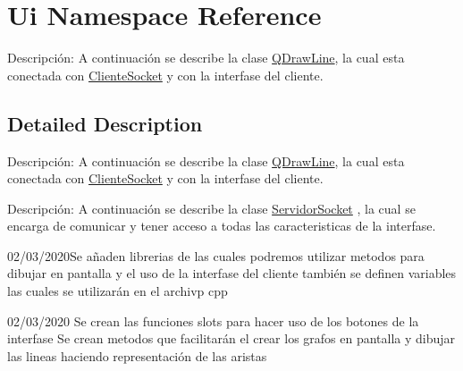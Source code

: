 \hypertarget{namespace_ui}{}\section{Ui Namespace Reference}
\label{namespace_ui}


Descripción\+: A continuación se describe la clase \hyperlink{class_q_draw_line}{Q\+Draw\+Line}, la cual esta conectada con \hyperlink{class_cliente_socket}{Cliente\+Socket} y con la interfase del cliente.  




\subsection{Detailed Description}
Descripción\+: A continuación se describe la clase \hyperlink{class_q_draw_line}{Q\+Draw\+Line}, la cual esta conectada con \hyperlink{class_cliente_socket}{Cliente\+Socket} y con la interfase del cliente. 

Descripción\+: A continuación se describe la clase \hyperlink{class_servidor_socket}{Servidor\+Socket} , la cual se encarga de comunicar y tener acceso a todas las caracteristicas de la interfase.

02/03/2020\+Se añaden librerias de las cuales podremos utilizar metodos para dibujar en pantalla y el uso de la interfase del cliente también se definen variables las cuales se utilizarán en el archivp cpp

02/03/2020 Se crean las funciones slots para hacer uso de los botones de la interfase Se crean metodos que facilitarán el crear los grafos en pantalla y dibujar las lineas haciendo representación de las aristas 